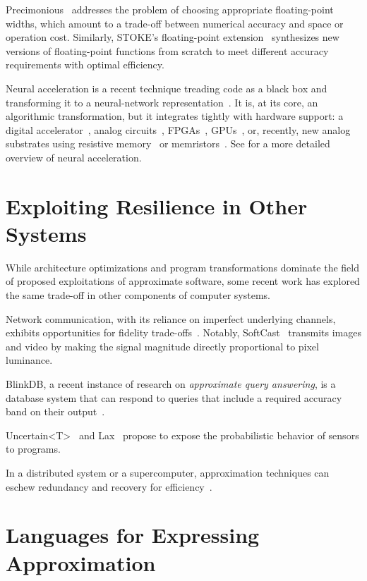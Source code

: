 Precimonious~\cite{precimonious} addresses the problem of choosing appropriate
floating-point widths, which amount to a trade-off between numerical accuracy
and space or operation cost.
Similarly, STOKE's floating-point extension~\cite{stoke-fp} synthesizes new
versions of floating-point functions from scratch to meet different accuracy
requirements with optimal efficiency.

Neural acceleration is a recent technique treading code as a black box and
transforming it to a neural-network representation~\cite{npu, emeuro, benchnn,
temam-isca}.
It is, at its core, an algorithmic transformation, but it integrates tightly
with hardware support: a digital accelerator~\cite{npu}, analog
circuits~\cite{anpu}, FPGAs~\cite{snnap},
GPUs~\cite{neuralgpu}, or, recently, new analog substrates using
resistive memory~\cite{rram-npu} or memristors~\cite{memristor-npu}.
See  for a more detailed overview of neural acceleration.


\section{Exploiting Resilience in Other Systems}

While architecture optimizations and program transformations dominate the
field of proposed exploitations of approximate software, some recent work has
explored the same trade-off in other components of computer systems.

Network
communication, with its reliance on imperfect underlying channels, exhibits
opportunities for fidelity trade-offs~\cite{softcast, luo-globecom, apex,
smpmup2006}. Notably, SoftCast~\cite{softcast} transmits images and video by
making the signal magnitude directly proportional to pixel luminance.

BlinkDB,
a recent instance of research on \emph{approximate query answering},
is a database system that can respond to queries that include a required
accuracy band on their output~\cite{blinkdb}.

Uncertain{\textless}T{\textgreater}~\cite{uncertaint} and Lax~\cite{lax}
propose to expose the probabilistic behavior of sensors to
programs.

In a distributed system or a supercomputer, approximation techniques can
eschew redundancy and recovery for efficiency~\cite{dekruijf-icpp}.


\section{Languages for Expressing Approximation}

